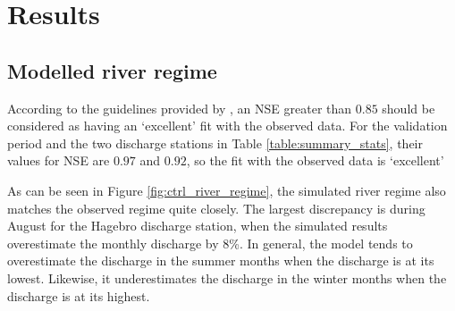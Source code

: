 \documentclass{article}
\begin{document}
\newpage
\section{Results}

\subsection{Modelled river regime}

According to the guidelines provided by \textcite{henriksen2008assessment}, an NSE greater than $0.85$ should be considered as having an `excellent' fit with the observed data. For the validation period and the two discharge stations in Table \ref{table:summary_stats}, their values for NSE are $0.97$ and $0.92$, so the fit with the observed data is `excellent'

\begin{table}[!h]
    \centering
\end{table}

As can be seen in Figure \ref{fig:ctrl_river_regime}, the simulated river regime also matches the observed regime quite closely. The largest discrepancy is during August for the Hagebro discharge station, when the simulated results overestimate the monthly discharge by 8\%. In general, the model tends to overestimate the discharge in the summer months when the discharge is at its lowest. Likewise, it underestimates the discharge in the winter months when the discharge is at its highest.
\end{document}
